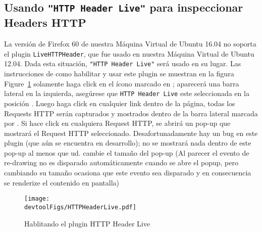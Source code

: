 
\newcommand{\devtoolFigs}{../Web_Common/Figs}


\subsection{Usando \texttt{"HTTP Header Live"} para inspeccionar Headers HTTP}
\label{web:sec:httpheaderlive}

La versión de Firefox 60 de nuestra Máquina Virtual de Ubuntu 16.04 no soporta el plugin \texttt{LiveHTTPHeader}, que fue usado en nuestra Máquina Virtual de Ubuntu 12.04.
Dada esta situación, \texttt{"HTTP Header Live"} será usado en su lugar.
Las instrucciones de como habilitar y usar este plugin se muestran en la figura Figure~\ref{web:fig:httpheader} solamente haga click en el ícono marcado en ; aparecerá una barra lateral en la izquierda, asegúrese que \texttt{HTTP Header Live} este seleccionada en la posición . Luego haga click en cualquier link dentro de la página, todas los Requests HTTP serán capturados y mostrados dentro de la barra lateral marcada por .
Si hace click en cualquiera Request HTTP, se abrirá un pop-up que mostrará el Request HTTP seleccionado. Desafortunadamente hay un bug en este plugin (que aún se encuentra en desarrollo); no se mostrará nada dentro de este pop-up al menos que ud. cambie el tamaño del pop-up (Al parecer el evento de re-drawing no es disparado automáticamente cuando se abre el popup, pero cambiando su tamaño ocasiona que este evento sea disparado y en consecuencia se renderize el contenido en pantalla)


\begin{figure}[htb]
\begin{center}
\texttt{[image: \\devtoolFigs/HTTPHeaderLive.pdf]}
\end{center}
\caption{Hablitando el plugin HTTP Header Live}
\label{web:fig:httpheader}
\end{figure}




